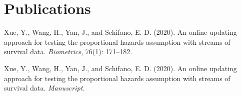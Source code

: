 \chapter{Publications}

\noindent {}
\setlength{\hangindent}{3em} Xue, Y., Wang, H., Yan, J., and Schifano, E. D. (2020). An online updating approach for testing the proportional hazards assumption with streams of survival data. {\it Biometrics}, 76(1): 171--182.

\noindent {}
\setlength{\hangindent}{3em} Xue, Y., Wang, H., Yan, J., and Schifano, E. D. (2020). An online updating approach for testing the proportional hazards assumption with streams of survival data. {\it Manuscript.}
